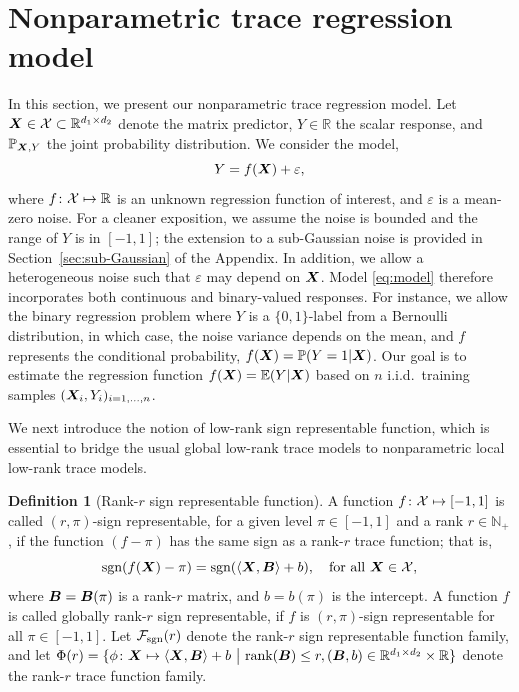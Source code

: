 \documentclass[11pt]{article}
\theoremstyle{plain}
\theoremstyle{definition}
\newtheorem{defn}{Definition}
\def\caliF{\tF_{\textup{sgn}}}
\def\sign{\textup{sgn}}
\def\caliF{\tF_{\textup{sgn}}}
\begin{document}
\section{Nonparametric trace regression model}
\label{sec:idea}

In this section, we present our nonparametric trace regression model. Let $\bm X\in\mathcal{X}\subset \mathbb{R}^{d_1\times d_2}$ denote the matrix predictor, $Y\in\mathbb{R}$ the scalar response, and $\mathbb{P}_{\bm X,Y}$ the joint probability distribution. We consider the model,
\begin{equation}\label{eq:model}
Y=f(\bm X)+\varepsilon,
\end{equation}
where $f\colon\mathcal{X}\mapsto \mathbb{R}$ is an unknown regression function of interest, and $\varepsilon$ is a mean-zero noise. For a cleaner exposition, we assume the noise is bounded and the range of $Y$ is in $[-1,1]$; the extension to a sub-Gaussian noise is provided in Section~\ref{sec:sub-Gaussian} of the Appendix. In addition, we allow a heterogeneous noise such that $\varepsilon$ may depend on $\bm X$. Model \eqref{eq:model} therefore incorporates both continuous and binary-valued responses. For instance, we allow the binary regression problem where $Y$ is a $\{0,1\}$-label from a Bernoulli distribution, in which case, the noise variance depends on the mean, and $f$ represents the conditional probability, $f(\bm X)=\mathbb{P}(Y=1|\bm X)$. Our goal is to estimate the regression function $f(\bm X)=\mathbb{E}(Y|\bm X)$ based on $n$ i.i.d.\ training samples $(\bm X_i,Y_i)_{i=1,\ldots,n}$. 

We next introduce the notion of low-rank sign representable function, which is essential to bridge the usual global low-rank trace models to nonparametric local low-rank trace models. 

\begin{defn}[Rank-$r$ sign representable function] \label{def:caliF}
A function $f\colon \mathcal{X}\mapsto[-1,1]$ is called $(r,\pi)$-sign representable, for a given level $\pi\in[-1,1]$ and a rank $r \in \mathbb{N}_{+}$, if the function $(f-\pi)$ has the same sign as a rank-$r$ trace function; that is,
\begin{equation} \label{eq:sign}
\sign(f(\mX)-\pi) = \sign(\langle \mX, \mB \rangle+b),\quad \text{for all }\mX\in\tX,
\end{equation}
where $\bm B=\bm B(\pi)$ is a rank-$r$ matrix, and $b=b(\pi)$ is the intercept. A function $f$ is called globally rank-$r$ sign representable, if $f$ is $(r,\pi)$-sign representable for all $\pi\in[-1,1]$. Let $\caliF(r)$ denote the rank-$r$ sign representable function family, and let $\Phi(r)=\{\phi\colon \bm X\mapsto \langle \bm X, \bm B \rangle+b\ \big|\ \text{rank}(\bm B)\leq r, (\bm B,b)\in\mathbb{R}^{d_1\times d_2}\times\mathbb{R}\}$ denote the rank-$r$ trace function family.
\end{defn}
\end{document}
